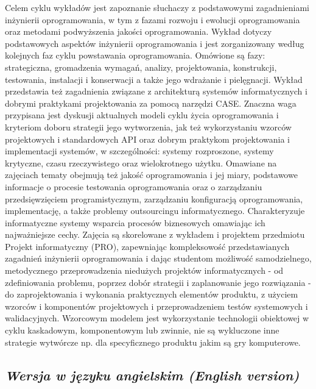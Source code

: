 \documentclass[12pt, a4paper]{article}
\begin{document}
Celem cyklu wykładów jest zapoznanie słuchaczy z podstawowymi zagadnieniami inżynierii oprogramowania, w tym z fazami rozwoju i ewolucji oprogramowania oraz metodami podwyższenia jakości oprogramowania. Wykład dotyczy podstawowych aspektów inżynierii oprogramowania i jest zorganizowany według kolejnych faz cyklu powstawania oprogramowania. Omówione są fazy: strategiczna, gromadzenia wymagań, analizy, projektowania, konstrukcji, testowania, instalacji i konserwacji a także jego wdrażanie i pielęgnacji. Wykład przedstawia też zagadnienia związane z architekturą systemów informatycznych i dobrymi praktykami projektowania za pomocą narzędzi CASE. Znaczna waga przypisana jest dyskusji aktualnych modeli cyklu życia oprogramowania i kryteriom doboru strategii jego wytworzenia, jak też wykorzystaniu wzorców projektowych i standardowych API oraz dobrym praktykom projektowania i implementacji systemów, w szczególności: systemy rozproszone, systemy krytyczne, czasu rzeczywistego oraz wielokrotnego użytku. Omawiane na zajęciach tematy obejmują też jakość oprogramowania i jej miary, podstawowe informacje o procesie testowania oprogramowania oraz o zarządzaniu przedsięwzięciem programistycznym, zarządzaniu konfiguracją oprogramowania, implementację, a także problemy outsourcingu informatycznego. Charakteryzuje informatyczne systemy wsparcia procesów biznesowych omawiając ich najważniejsze cechy. Zajęcia są skorelowane z wykładem i projektem przedmiotu Projekt informatyczny (PRO), zapewniając kompleksowość przedstawianych zagadnień inżynierii oprogramowania i dając studentom możliwość samodzielnego, metodycznego przeprowadzenia niedużych projektów informatycznych - od zdefiniowania problemu, poprzez dobór strategii i zaplanowanie jego rozwiązania - do zaprojektowania i wykonania praktycznych elementów produktu, z użyciem wzorców i komponentów projektowych i przeprowadzeniem testów systemowych i walidacyjnych. Wzorcowym modelem jest wykorzystanie technologii obiektowej w cyklu kaskadowym, komponentowym lub zwinnie, nie są wykluczone inne strategie wytwórcze np. dla specyficznego produktu jakim są gry komputerowe.

\subsection*{\textit{Wersja w języku angielskim (English version)}}
\end{document}
